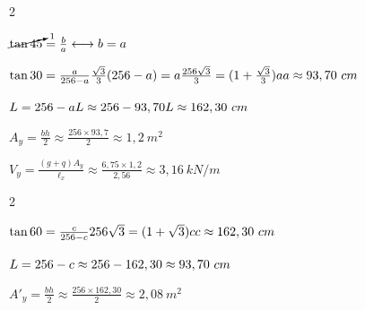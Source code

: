 \begin{resposta}
\begin{enumerate}[start=2]
\begin{enumerate}
    
             \newpage

            \begin{multicols}{2}

                
    
                $\cancelto{1}{\tan 45}=\frac{b}{a} \longleftrightarrow b=a$ \newline
    
                $\tan 30=\frac{a}{256-a} \newline \frac{\sqrt{3}}{3} (256-a)=a \newline \frac{256\sqrt{3}}{3}=(1+\frac{\sqrt{3}}{3})a \newline a \approx 93,70 \ cm$ \newline
    
                $L=256-a\newline L\approx256-93,70 \newline L\approx 162,30 \ cm$ \newline
            \end{multicols}

            $A_y= \frac{bh}{2}\approx\frac{256\times 93,7}{2}\approx1,2 \ m^2$ \newline

            $V_y = \frac{(g+q)A_y}{\ell_x}\approx\frac{6,75 \times 1,2}{2,56}\approx3,16 \ kN/m$ \newline

            \begin{multicols}{2}

                

                $\tan 60 =\frac{c}{256-c} \newline 256 \sqrt{3}=(1+\sqrt{3})c \newline c \approx 162,30 \ cm$ \newline
    
                $L=256-c\newline\approx256-162,30\newline \approx93,70 \ cm$ \newline
                
            \end{multicols}

            $A'_y=\frac{bh}{2}\approx\frac{256\times162,30}{2}\approx2,08 \ m^2$ \newline


\end{enumerate}
\end{enumerate}
\end{resposta}
